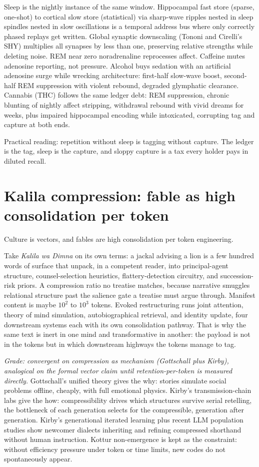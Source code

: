 Sleep is the nightly instance of the same window. Hippocampal fast store (sparse, one-shot) to cortical slow store (statistical) via sharp-wave ripples nested in sleep spindles nested in slow oscillations is a temporal address bus where only correctly phased replays get written. Global synaptic downscaling (Tononi and Cirelli's SHY) multiplies all synapses by less than one, preserving relative strengths while deleting noise. REM near zero noradrenaline reprocesses affect. Caffeine mutes adenosine reporting, not pressure. Alcohol buys sedation with an artificial adenosine surge while wrecking architecture: first-half slow-wave boost, second-half REM suppression with violent rebound, degraded glymphatic clearance. Cannabis (THC) follows the same ledger debt: REM suppression, chronic blunting of nightly affect stripping, withdrawal rebound with vivid dreams for weeks, plus impaired hippocampal encoding while intoxicated, corrupting tag and capture at both ends.

Practical reading: repetition without sleep is tagging without capture. The ledger is the tag, sleep is the capture, and sloppy capture is a tax every holder pays in diluted recall.

\section{Kalila compression: fable as high consolidation per token}

Culture is vectors, and fables are high consolidation per token engineering.

Take \textit{Kalila wa Dimna} on its own terms: a jackal advising a lion is a few hundred words of surface that unpack, in a competent reader, into principal-agent structure, counsel-selection heuristics, flattery-detection circuitry, and succession-risk priors. A compression ratio no treatise matches, because narrative smuggles relational structure past the salience gate a treatise must argue through. Manifest content is maybe $10^2$ to $10^3$ tokens. Evoked restructuring runs joint attention, theory of mind simulation, autobiographical retrieval, and identity update, four downstream systems each with its own consolidation pathway. That is why the same text is inert in one mind and transformative in another: the payload is not in the tokens but in which downstream highways the tokens manage to tag.

\textit{Grade: convergent on compression as mechanism (Gottschall plus Kirby), analogical on the formal vector claim until retention-per-token is measured directly.} Gottschall's unified theory gives the why: stories simulate social problems offline, cheaply, with full emotional physics. Kirby's transmission-chain labs give the how: compressibility drives which structures survive serial retelling, the bottleneck of each generation selects for the compressible, generation after generation. Kirby's generational iterated learning plus recent LLM population studies show newcomer dialects inheriting and refining compressed shorthand without human instruction. Kottur non-emergence is kept as the constraint: without efficiency pressure under token or time limits, new codes do not spontaneously appear.

